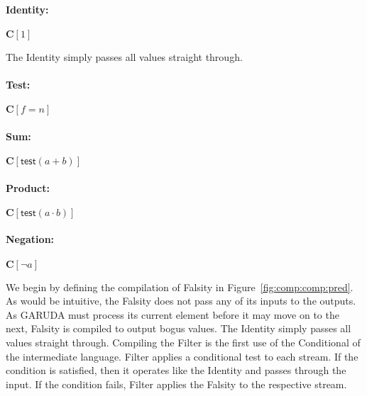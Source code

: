 \documentclass[sigconf,usenames,dvipsnames,svgnames,table]{acmart}
\def \oldname {\textsc{GARUDA}\xspace}
\begin{document}
        \paragraph{Identity:}
          $\mathbf{C}[1]$ \par\noindent
          The Identity simply passes all values straight through.

        \paragraph{Test:}
          $\mathbf{C}[f = n]$ \par

        \paragraph{Sum:}
          $\mathbf{C}[\mathsf{test}(a + b)]$ \par

        \paragraph{Product:}
          $\mathbf{C}[\mathsf{test}(a \cdot b)]$ \par

        \paragraph{Negation:}
          $\mathbf{C}[\neg a]$ \par



        We begin by defining the compilation of Falsity in Figure~\ref{fig:comp:comp:pred}.
        As would be intuitive, the Falsity does not pass any of its inputs to the outputs.
        As \oldname must process its current element before it may move on to the next, Falsity is compiled to output bogus values.
        The Identity simply passes all values straight through.
        Compiling the Filter is the first use of the Conditional of the intermediate language.
        Filter applies a conditional test to each stream.
        If the condition is satisfied, then it operates like the Identity and passes through the input.
        If the condition fails, Filter applies the Falsity to the respective stream.
        \par
\end{document}
